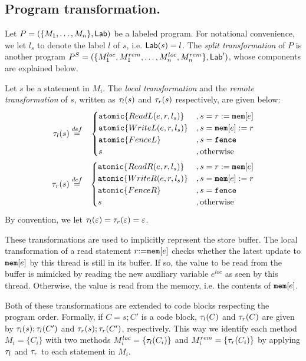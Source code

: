 \documentclass[preprint,9pt]{sigplanconf}
\begin{document}
{\subsection{Program transformation.}
\label{subsec:program-transformation}
Let $P=(\{M_1,\ldots,M_n\},\mathsf{Lab})$ be a labeled program.
For notational convenience, we let $l_s$ to denote the label $l$ of $s$, i.e. $\mathsf{Lab}(s)=l$.
The {\em split transformation} of $P$ is another program $P^S=(\{M^{loc}_1,M^{rem}_1,\ldots,M^{loc}_n,M^{rem}_n\},\mathsf{Lab}')$, whose components are explained below.

Let $s$ be a statement in $M_i$.
The {\em local transformation} and the {\em remote transformation} of $s$, written as $\tau_{l}(s)$ and $\tau_{r}(s)$ respectively, are given below:
\begin{eqnarray*}
 \tau_{l}(s)  & \stackrel{def}{=} &
  \begin{cases}
   \mathtt{atomic}\{ReadL(e,r,l_s)\} & , s=r:=\mathtt{mem}[e]\\
   \mathtt{atomic}\{WriteL(e,r,l_s)\} & , s=\mathtt{mem}[e]:= r\\
   \mathtt{atomic}\{FenceL\} & , s=\mathtt{fence}\\
   s & , \textnormal{otherwise}
  \end{cases}\\
 \tau_{r}(s) & \stackrel{def}{=} &
  \begin{cases}
   \mathtt{atomic}\{ReadR(e,r,l_s)\} & , s=r:=\mathtt{mem}[e]\\
   \mathtt{atomic}\{WriteR(e,r,l_s)\} & , s=\mathtt{mem}[e]:= r\\
   \mathtt{atomic}\{FenceR\} & , s=\mathtt{fence}\\
   s & , \textnormal{otherwise}
  \end{cases}
\end{eqnarray*}
By convention, we let $\tau_{l}(\varepsilon)=\tau_{r}(\varepsilon)=\varepsilon$.

These transformations are used to implicitly represent the store buffer.
The local transformation of a read statement $r\mathtt{:=}\mathtt{mem}[e]$ checks whether the latest update to $\mathtt{mem}[e]$ by this thread is still in its buffer.
If so, the value to be read from the buffer is mimicked by reading the new auxiliary variable $e^{loc}$ as seen by this thread.
Otherwise, the value is read from the memory, i.e. the contents of $\mathtt{mem}[e]$.

Both of these transformations are extended to code blocks respecting the program order.
Formally, if $C=s;C'$ is a code block, $\tau_{l}(C)$ and $\tau_{r}(C)$ are given by $\tau_{l}(s); \tau_{l}(C')$ and $\tau_{r}(s); \tau_{r}(C')$, respectively.
This way we identify each method $M_i=\{C_i\}$ with two methods $M^{loc}_i=\{\tau_{l}(C_i)\}$ and $M^{rem}_i=\{\tau_{r}(C_i)\}$ by applying $\tau_{l}$ and $\tau_{r}$ to each statement in $M_i$.
}
\end{document}
